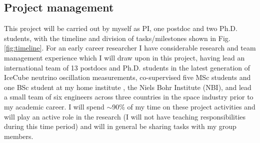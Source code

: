 \documentclass[a4paper,11pt]{article}
\begin{document}
\subsection{Project management}

This project will be carried out by myself as PI, one postdoc and two Ph.D. students, with the timeline and division of tasks/milestones shown in Fig. \ref{fig:timeline}. For an early career researcher I have considerable research and team management experience which I will draw upon in this project, having lead an international team of 13 postdocs and Ph.D. students in the latest generation of IceCube neutrino oscillation measurements, co-supervised five MSc students and one BSc student at my home institute , the Niels Bohr Institute (NBI), and lead a small team of six engineers across three countries in the space industry prior to my academic career. I will spend $\sim$90\% of my time on these project activities and will play an active role in the research (I will not have teaching responsibilities during this time period) and will in general be sharing tasks with my group members.
\end{document}
